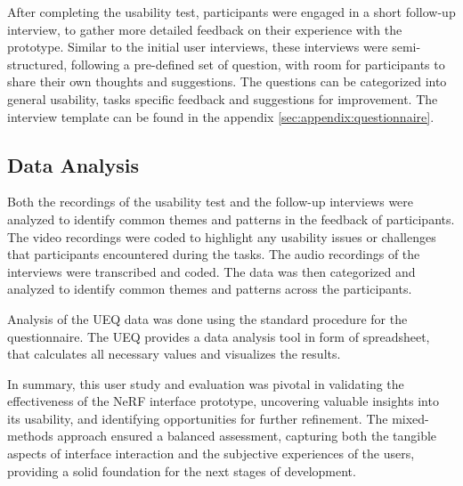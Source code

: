 After completing the usability test, participants were engaged in a short follow-up interview, to gather more detailed feedback on their experience with the prototype. 
Similar to the initial user interviews, these interviews were semi-structured, following a pre-defined set of question, with room for participants to share their own thoughts and suggestions.
The questions can be categorized into general usability, tasks specific feedback and suggestions for improvement.
The interview template can be found in the appendix \ref{sec:appendix:questionnaire}.


\subsection*{Data Analysis}
\label{sec:methodology:study:analysis}

Both the recordings of the usability test and the follow-up interviews were analyzed to identify common themes and patterns in the feedback of participants.
The video recordings were coded to highlight any usability issues or challenges that participants encountered during the tasks.
The audio recordings of the interviews were transcribed and coded.
The data was then categorized and analyzed to identify common themes and patterns across the participants.

Analysis of the UEQ data was done using the standard procedure for the questionnaire.
The UEQ provides a data analysis tool in form of spreadsheet, that calculates all necessary values and visualizes the results.

In summary, this user study and evaluation was pivotal in validating the effectiveness of the NeRF interface prototype, uncovering valuable insights into its usability, and identifying opportunities for further refinement. 
The mixed-methods approach ensured a balanced assessment, capturing both the tangible aspects of interface interaction and the subjective experiences of the users, providing a solid foundation for the next stages of development.
